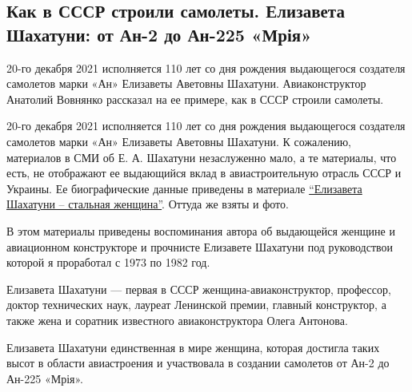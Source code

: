  
 
 
 
 
\subsection{Как в СССР строили самолеты. Елизавета Шахатуни: от Ан-2 до Ан-225 «Мрія»}
\label{sec:13_12_2021.stz.news.ua.hvylya.1.vovnjanko_shahatuni_an225}


20-го декабря 2021 исполняется 110 лет со дня рождения выдающегося создателя
самолетов марки «Ан» Елизаветы Аветовны Шахатуни. Авиаконструктор Анатолий
Вовнянко рассказал на ее примере, как в СССР строили самолеты.


20-го декабря 2021 исполняется 110 лет со дня рождения выдающегося создателя
самолетов марки «Ан» Елизаветы Аветовны Шахатуни. К сожалению, материалов в СМИ
об Е. А. Шахатуни незаслуженно мало, а те материалы, что есть, не отображают ее
выдающийся вклад в авиастроительную отрасль СССР и Украины. Ее биографические
данные приведены в материале
\href{https://vstrokax.net/istoriya/elizaveta-shahatuni-stalnaya-ledi/}{\enquote{Елизавета
Шахатуни – стальная женщина}}. Оттуда же взяты и фото.


В этом материалы приведены воспоминания автора об выдающейся женщине и
авиационном конструкторе и прочнисте Елизавете Шахатуни под руководствои
которой я проработал с 1973 по 1982 год.

Елизавета Шахатуни — первая в СССР женщина-авиаконструктор, профессор, доктор
технических наук, лауреат Ленинской премии, главный конструктор, а также жена и
соратник известного авиаконструктора Олега Антонова.

Елизавета Шахатуни единственная в мире женщина, которая достигла таких высот в
области авиастроения и участвовала в создании самолетов от Ан-2 до Ан-225
«Мрія».

